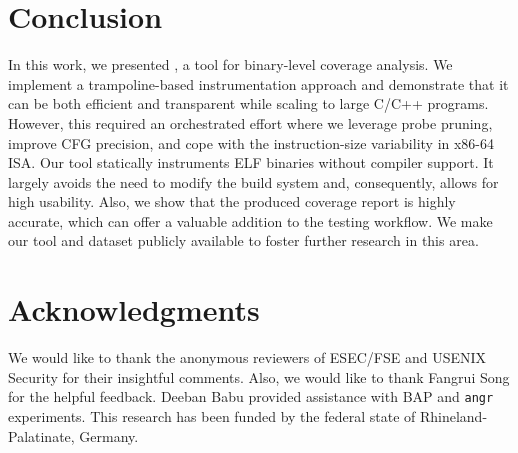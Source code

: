 \section{Conclusion}

In this work, we presented {\bcov}, a tool for binary-level coverage analysis.
We implement a trampoline-based instrumentation approach and demonstrate that it can be both efficient and transparent while scaling to large C/C++ programs.
However, this required an orchestrated effort where we leverage probe pruning, improve CFG precision, and cope with the instruction-size variability in x86-64 ISA.
Our tool statically instruments ELF binaries without compiler support. 
It largely avoids the need to modify the build system and, consequently, allows for high usability.
Also, we show that the produced coverage report is highly accurate, which can offer a valuable addition to the testing workflow.
We make our tool and dataset publicly available to foster further research in this area.

\section*{Acknowledgments}
We would like to thank the anonymous reviewers of  ESEC/FSE and USENIX Security for their insightful comments. 
Also, we would like to thank Fangrui Song for the helpful feedback.
Deeban Babu provided assistance with BAP and \texttt{angr} experiments. 
This research has been funded by the federal state of Rhineland-Palatinate, Germany.

\balance


